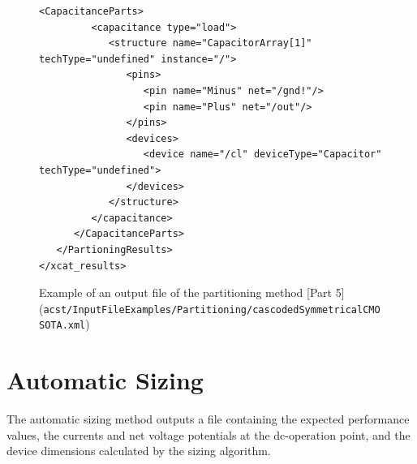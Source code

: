 \begin{figure}[H]
	\begin{lstlisting}[basicstyle=\ttfamily\scriptsize,backgroundcolor={\color{gray!30}}, escapechar=? ]
      <CapacitanceParts>
         <capacitance type="load">
            <structure name="CapacitorArray[1]" techType="undefined" instance="/">
               <pins>
                  <pin name="Minus" net="/gnd!"/>
                  <pin name="Plus" net="/out"/>
               </pins>
               <devices>
                  <device name="/cl" deviceType="Capacitor" techType="undefined">
               </devices>
            </structure>
         </capacitance>
      </CapacitanceParts>
   </PartioningResults>
</xcat_results>		
	\end{lstlisting}
	\caption{Example of an output file of the partitioning method [Part 5] ({\tt acst/InputFileExamples/Partitioning/cascodedSymmetricalCMOSOTA.xml})}
\end{figure}

\section{Automatic Sizing}\label{sec:OutputFileAutomaticSizing}
The automatic sizing method outputs  a file containing the expected performance values, the currents and net voltage potentials at the dc-operation point, and the device dimensions calculated by the sizing algorithm. 

